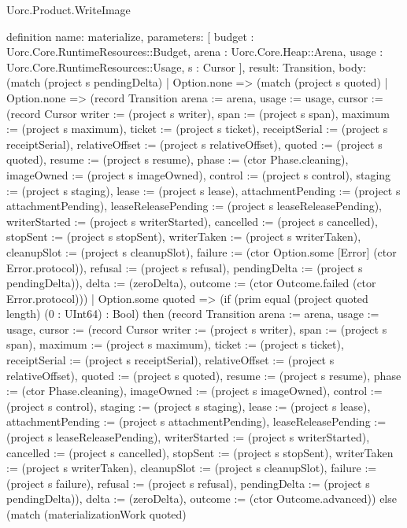 \begin{lexlean}{Uorc.Product.WriteImage}
\begin{semanticmodule}
definition{
  name: materialize,
  parameters: [
    budget : Uorc.Core.RuntimeResources::Budget,
    arena : Uorc.Core.Heap::Arena,
    usage : Uorc.Core.RuntimeResources::Usage,
    s : Cursor
  ],
  result: Transition,
  body: (match (project s pendingDelta)
    | Option.none => (match (project s quoted)
      | Option.none => (record Transition {arena := arena, usage := usage, cursor := (record Cursor {writer := (project s writer), span := (project s span), maximum := (project s maximum), ticket := (project s ticket), receiptSerial := (project s receiptSerial), relativeOffset := (project s relativeOffset), quoted := (project s quoted), resume := (project s resume), phase := (ctor Phase.cleaning), imageOwned := (project s imageOwned), control := (project s control), staging := (project s staging), lease := (project s lease), attachmentPending := (project s attachmentPending), leaseReleasePending := (project s leaseReleasePending), writerStarted := (project s writerStarted), cancelled := (project s cancelled), stopSent := (project s stopSent), writerTaken := (project s writerTaken), cleanupSlot := (project s cleanupSlot), failure := (ctor Option.some [Error] (ctor Error.protocol)), refusal := (project s refusal), pendingDelta := (project s pendingDelta)}), delta := (zeroDelta), outcome := (ctor Outcome.failed (ctor Error.protocol))})
      | Option.some quoted => (if (prim equal (project quoted length) (0 : UInt64) : Bool) then (record Transition {arena := arena, usage := usage, cursor := (record Cursor {writer := (project s writer), span := (project s span), maximum := (project s maximum), ticket := (project s ticket), receiptSerial := (project s receiptSerial), relativeOffset := (project s relativeOffset), quoted := (project s quoted), resume := (project s resume), phase := (ctor Phase.cleaning), imageOwned := (project s imageOwned), control := (project s control), staging := (project s staging), lease := (project s lease), attachmentPending := (project s attachmentPending), leaseReleasePending := (project s leaseReleasePending), writerStarted := (project s writerStarted), cancelled := (project s cancelled), stopSent := (project s stopSent), writerTaken := (project s writerTaken), cleanupSlot := (project s cleanupSlot), failure := (project s failure), refusal := (project s refusal), pendingDelta := (project s pendingDelta)}), delta := (zeroDelta), outcome := (ctor Outcome.advanced)}) else (match (materializationWork quoted)
}
\end{semanticmodule}
\end{lexlean}
